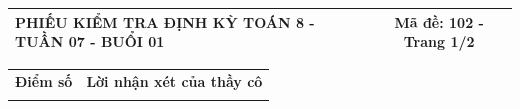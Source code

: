 \documentclass[12pt,a4paper]{article}
\begin{document}
\newpage
\noindent
\begin{tabularx}{\linewidth}{|X|c|}
\hline
\textbf{PHIẾU KIỂM TRA ĐỊNH KỲ TOÁN 8 - TUẦN 07 - BUỔI 01} & \textbf{Mã đề: 102 - Trang 1/2} \\
\hline
\end{tabularx}

\vspace{1.2mm}

\noindent
\begin{tabularx}{\linewidth}{|p{3.2cm}|X|}
\hline
\centering\textbf{Điểm số} & \centering\textbf{Lời nhận xét của thầy cô} \tabularnewline
\rule{0pt}{1.8cm} & \\
\hline
\end{tabularx}

\vspace{1.2mm}
\end{document}
